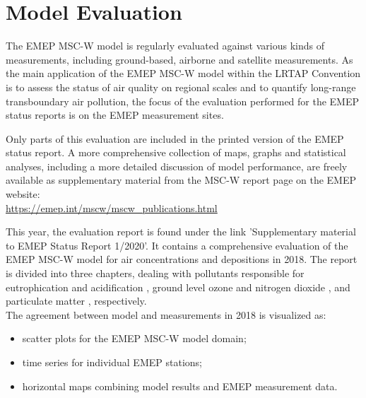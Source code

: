 \setcounter{page}{1}

\cleardoublepage
\chapter[2019 Model Evaluation]{Model Evaluation}
\label{ch:appx_modeleval}



The EMEP MSC-W model is regularly evaluated against various kinds of measurements, including ground-based, airborne and satellite measurements. As the main application of the EMEP MSC-W model within the LRTAP Convention is to assess the status of air quality on regional scales and to quantify long-range transboundary air pollution, the focus of the evaluation performed for the EMEP status reports is on the EMEP measurement sites.

Only parts of this evaluation are included in the printed version of the EMEP status report. A more comprehensive collection of maps, graphs and statistical analyses, including a more detailed discussion of model performance, are freely available as supplementary material from the MSC-W report page on the EMEP website:\\ \url{https://emep.int/mscw/mscw_publications.html}

This year, the evaluation report is found under the link 'Supplementary material to EMEP Status Report 1/2020'. It contains a comprehensive evaluation of the EMEP MSC-W model for air concentrations and depositions in 2018. The report is divided into three chapters, dealing with pollutants responsible for eutrophication and acidification \citep{WEB2020:SN}, ground level ozone and nitrogen dioxide
\citep{WEB2020:O3}, and particulate matter \citep{WEB2020:PM}, respectively.\\

The agreement between model and measurements in 2018 is visualized as:
\begin{itemize}
\item scatter plots for the EMEP MSC-W model domain;
\item time series for individual EMEP stations;
\item horizontal maps combining model results and EMEP measurement data.
\end{itemize}

